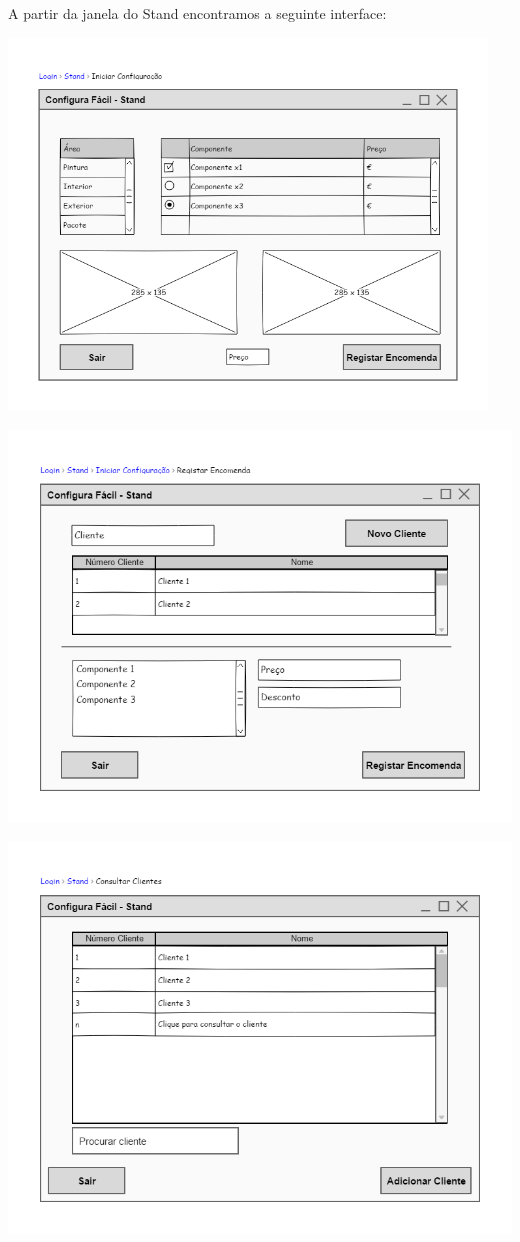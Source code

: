 A partir da janela do Stand encontramos a seguinte interface:
\begin{center}
 	\includegraphics[width = 5in]{Prototipagem/configurao_de_carro.png}

 	\includegraphics[width = 5.5in]{Prototipagem/registar_encomenda.png}

 	\includegraphics[width = 5.5in]{Prototipagem/consultar_clientes.png}
	

\end{center}
